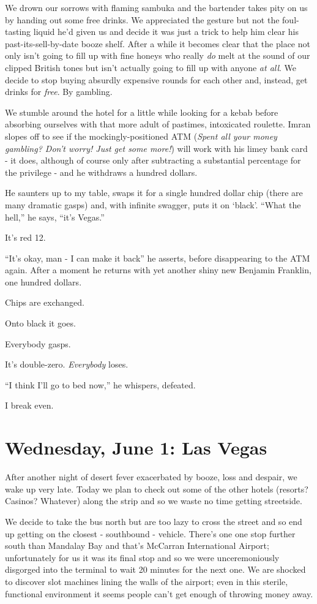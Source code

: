 \documentclass[a5paper,titlepage,11pt]{book}
\begin{document}
We drown our sorrows with flaming sambuka and the bartender takes pity on us by handing out some free drinks.  We appreciated the gesture but not the foul-tasting liquid he'd given us and decide it was just a trick to help him clear his past-its-sell-by-date booze shelf.  After a while it becomes clear that the place not only isn't going to fill up with fine honeys who really \emph{do} melt at the sound of our clipped British tones but isn't actually going to fill up with anyone \emph{at all}.  We decide to stop buying absurdly expensive rounds for each other and, instead, get drinks for \emph{free}.  By gambling.

We stumble around the hotel for a little while looking for a kebab before absorbing ourselves with that more adult of pastimes, intoxicated roulette.  Imran slopes off to see if the mockingly-positioned ATM (\emph{Spent all your money gambling?  Don't worry!  Just get some more!}) will work with his limey bank card - it does, although of course only after subtracting a substantial percentage for the privilege - and he withdraws a hundred dollars.

He saunters up to my table, swaps it for a single hundred dollar chip (there are many dramatic gasps) and, with infinite swagger, puts it on `black'.  ``What the hell,'' he says, ``it's Vegas.''

It's red 12.

``It's okay, man - I can make it back'' he asserts, before disappearing to the ATM again.  After a moment he returns with yet another shiny new Benjamin Franklin, one hundred dollars.

Chips are exchanged.

Onto black it goes.

Everybody gasps.

It's double-zero.  \emph{Everybody} loses.

``I think I'll go to bed now,'' he whispers, defeated.

I break even.

\chapter[Las Vegas]{Wednesday, June 1: Las Vegas}
After another night of desert fever exacerbated by booze, loss and despair, we wake up very late.  Today we plan to check out some of the other hotels (resorts? Casinos?  Whatever) along the strip and so we waste no time getting streetside.

We decide to take the bus north but are too lazy to cross the street and so end up getting on the closest - southbound - vehicle.  There's one one stop further south than Mandalay Bay and that's McCarran International Airport; unfortunately for us it was its final stop and so we were unceremoniously disgorged into the terminal to wait 20 minutes for the next one.  We are shocked to discover slot machines lining the walls of the airport; even in this sterile, functional environment it seems people can't get enough of throwing money away.
\end{document}
